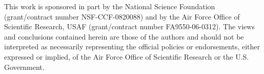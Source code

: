 
This work is sponsored in part by the National Science Foundation (grant/contract number NSF-CCF-0820088)
and by the Air Force Office of Scientific Research, USAF (grant/contract number FA9550-06-0312).  
The views and conclusions contained herein are those of the authors and should not be 
interpreted as necessarily representing the official policies or endorsements, either 
expressed or implied, of the Air Force Office of Scientific Research or the U.S. Government.



